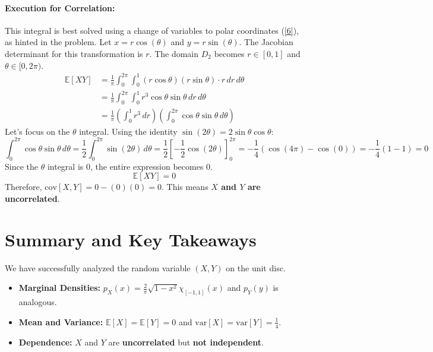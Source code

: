 \documentclass[11pt,a4paper]{article}
\theoremstyle{mystyle}
\begin{document}
\paragraph{Execution for Correlation:}
This integral is best solved using a change of variables to polar coordinates (\hyperlink{note6}{[6]}), as hinted in the problem.
Let $x = r\cos(\theta)$ and $y = r\sin(\theta)$. The Jacobian determinant for this transformation is $r$. The domain $D_2$ becomes $r \in [0, 1]$ and $\theta \in [0, 2\pi)$.
\begin{align*}
\mathbb{E}[XY] &= \frac{1}{\pi} \int_{0}^{2\pi} \int_{0}^{1} (r\cos\theta)(r\sin\theta) \cdot r \,dr\,d\theta \\
&= \frac{1}{\pi} \int_{0}^{2\pi} \int_{0}^{1} r^3 \cos\theta \sin\theta \,dr\,d\theta \\
&= \frac{1}{\pi} \left( \int_{0}^{1} r^3 \,dr \right) \left( \int_{0}^{2\pi} \cos\theta \sin\theta \,d\theta \right)
\end{align*}
Let's focus on the $\theta$ integral. Using the identity $\sin(2\theta) = 2\sin\theta\cos\theta$:
\[
\int_{0}^{2\pi} \cos\theta \sin\theta \,d\theta = \frac{1}{2} \int_{0}^{2\pi} \sin(2\theta) \,d\theta = \frac{1}{2} \left[ -\frac{1}{2}\cos(2\theta) \right]_{0}^{2\pi} = -\frac{1}{4} (\cos(4\pi) - \cos(0)) = -\frac{1}{4}(1-1) = 0
\]
Since the $\theta$ integral is 0, the entire expression becomes 0.
\[
\mathbb{E}[XY] = 0
\]
Therefore, $\text{cov}[X,Y] = 0 - (0)(0) = 0$. This means \textbf{$X$ and $Y$ are uncorrelated}.

\section{Summary and Key Takeaways}

We have successfully analyzed the random variable $(X,Y)$ on the unit disc.
\begin{itemize}
    \item \textbf{Marginal Densities:} $p_X(x) = \frac{2}{\pi} \sqrt{1-x^2} \chi_{[-1,1]}(x)$ and $p_Y(y)$ is analogous.
    \item \textbf{Mean and Variance:} $\mathbb{E}[X] = \mathbb{E}[Y] = 0$ and $\text{var}[X] = \text{var}[Y] = \frac{1}{4}$.
    \item \textbf{Dependence:} $X$ and $Y$ are \textbf{uncorrelated} but \textbf{not independent}.
\end{itemize}
\end{document}
